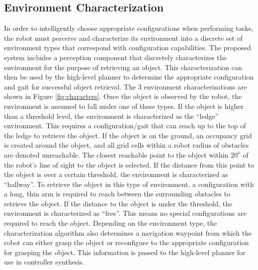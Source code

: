 \documentclass[conference]{IEEEtran}
\begin{document}
\subsection{Environment Characterization}
\label{sec:environment-characterization}
%
In order to intelligently choose appropriate configurations when performing tasks, the robot must perceive and characterize its environment into a discrete set of environment types that correspond with configuration capabilities. The proposed system includes a perception component that discretely characterizes the environment for the purpose of retrieving an object. This characterization can then be used by the high-level planner to determine the appropriate configuration and gait for successful object retrieval. The 3 environment characterizations are shown in Figure \ref{fig:characters}. Once the object is observed by the robot, the environment is assumed to fall under one of these types. If the object is higher than a threshold level, the environment is characterized as the ``ledge'' environment. This requires a configuration/gait that can reach up to the top of the ledge to retrieve the object. If the object is on the ground, an occupancy grid is created around the object, and all grid cells within a robot radius of obstacles are denoted unreachable. The closest reachable point to the object within $20^o$ of the robot's line of sight to the object is selected. If the distance from this point to the object is over a certain threshold, the environment is characterized as ``hallway''. To retrieve the object in this type of environment, a configuration with a long, thin arm is required to reach between the surrounding obstacles to retrieve the object. If the distance to the object is under the threshold, the environment is characterized as ``free''. This means no special configurations are required to reach the object. Depending on the environment type, the characterization algorithm also determines a navigation waypoint from which the robot can either grasp the object or reconfigure to the appropriate configuration for grasping the object. This information is passed to the high-level planner for use in controller synthesis.


\end{document}
